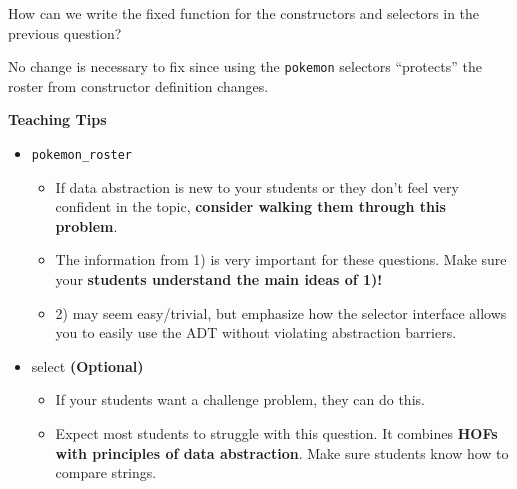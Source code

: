     
    \begin{blocksection}
    \question How can we write the fixed  function for
    the constructors and selectors in the previous question?
    
    \begin{solution}[1.5in]
    No change is necessary to fix  since using the
    \texttt{pokemon} selectors ``protects'' the roster from constructor definition
    changes.
    \end{solution}
    
    \begin{guide}
    \textbf{Teaching Tips}
    \begin{itemize}
        \item \texttt{pokemon\_roster}
        \begin{itemize}
            \item If data abstraction is new to your students or they don’t feel very confident in the topic, \textbf{consider walking them through this problem}.
            \item The information from 1) is very important for these questions. Make sure your \textbf{students understand the main ideas of 1)!}
            \item 2) may seem easy/trivial, but emphasize how the selector interface allows you to easily use the ADT without violating abstraction barriers.
        \end{itemize}
        \item select \textbf{(Optional)}
        \begin{itemize}
            \item If your students want a challenge problem, they can do this.
            \item Expect most students to struggle with this question. It combines \textbf{HOFs with principles of data abstraction}. Make sure students know how to compare strings.
        \end{itemize}
    \end{itemize}
    \end{guide}
    
    \end{blocksection}
    
